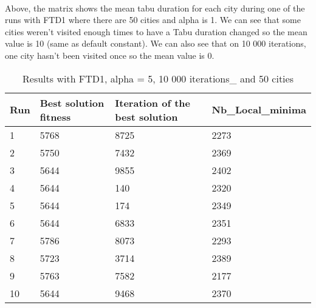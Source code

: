 \documentclass[12pt,oneside,a4paper]{article}
\begin{document}
\paragraph{}
Above, the matrix shows the mean tabu duration for each city during one of the runs with FTD1
where there are 50 cities and alpha is 1. We can see that some cities weren't visited enough times
to have a Tabu duration changed so the mean value is 10 (same as default constant). We can also
see that on 10 000 iterations, one city hasn't been visited once so the mean value is 0.

\newpage
\begin{table}[h]
  \centering
  \small
  \begin{tabular}{llll}
    \hline
    \multicolumn{1}{|l|}{\textbf{Run}}& \multicolumn{1}{l|}{\textbf{Best solution fitness}}& \multicolumn{1}{l|}{\textbf{Iteration of the best solution}}& \multicolumn{1}{l|}{\textbf{Nb\_Local\_minima}}\\ \hline
    \multicolumn{1}{|l|}{1} & \multicolumn{1}{l|}{5768}  & \multicolumn{1}{l|}{8725} & \multicolumn{1}{l|}{2273}  \\ \hline
    \multicolumn{1}{|l|}{2} & \multicolumn{1}{l|}{5750}  & \multicolumn{1}{l|}{7432} & \multicolumn{1}{l|}{2369}  \\ \hline
    \multicolumn{1}{|l|}{3} & \multicolumn{1}{l|}{5644}  & \multicolumn{1}{l|}{9855}  & \multicolumn{1}{l|}{2402}  \\ \hline
    \multicolumn{1}{|l|}{4} & \multicolumn{1}{l|}{5644}  & \multicolumn{1}{l|}{140}  & \multicolumn{1}{l|}{2320}  \\ \hline
    \multicolumn{1}{|l|}{5} & \multicolumn{1}{l|}{5644}  & \multicolumn{1}{l|}{174}  & \multicolumn{1}{l|}{2349}  \\ \hline
    \multicolumn{1}{|l|}{6} & \multicolumn{1}{l|}{5644}  & \multicolumn{1}{l|}{6833}  & \multicolumn{1}{l|}{2351}  \\ \hline
    \multicolumn{1}{|l|}{7} & \multicolumn{1}{l|}{5786}  & \multicolumn{1}{l|}{8073}  & \multicolumn{1}{l|}{2293}  \\ \hline
    \multicolumn{1}{|l|}{8} & \multicolumn{1}{l|}{5723}  & \multicolumn{1}{l|}{3714} & \multicolumn{1}{l|}{2389}  \\ \hline
    \multicolumn{1}{|l|}{9} & \multicolumn{1}{l|}{5763}  & \multicolumn{1}{l|}{7582} & \multicolumn{1}{l|}{2177}  \\ \hline
    \multicolumn{1}{|l|}{10} & \multicolumn{1}{l|}{5644}  & \multicolumn{1}{l|}{9468} & \multicolumn{1}{l|}{2370}  \\ \hline
  \end{tabular}
  \caption{Results with FTD1, alpha = 5, 10 000 iterations\_ and 50 cities}
\end{table}
\end{document}
